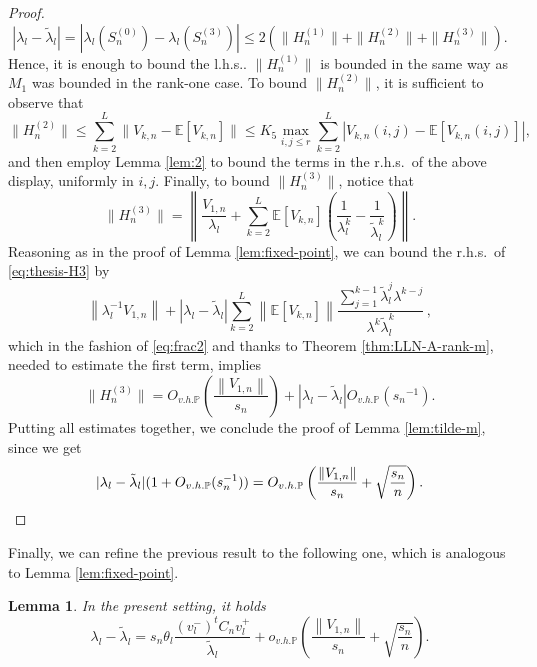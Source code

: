 \documentclass[11pt,oneside]{amsart}
\theoremstyle{plain}
\newtheorem{lemma}[theorem]{Lemma}
\numberwithin{equation}{section}
\newcommand{\rhs}{{r.h.s.~}}
\newcommand{\E}{\mathbb{E}}
\newcommand{\p}{\mathbb{P}}
\newcommand{\centered}{C_n}
\newcommand{\deterministic}{S_n}
\newcommand{\scaling}{s_n}
\newcommand{\ohp}{o_{v.h.\p}}
\newcommand{\Ohp}{O_{v.h.\p}}
\begin{document}
\begin{proof}
\begin{equation}
    |\lambda_l-\tilde \lambda_l|=|\lambda_l(\deterministic^{(0)})-\lambda_l(\deterministic^{(3)})|\le 2(\|H^{(1)}_n\|+\|H^{(2)}_n\|+\|H^{(3)}_n\|).
\end{equation}
Hence, it is enough to bound the l.h.s.. 
$\|H^{(1)}_n\|$ is bounded in the same way as $M_1$ was bounded in the rank-one case.
To bound $\|H^{(2)}_n\|$, it is sufficient to observe that
\begin{equation}
    \|H^{(2)}_n\| \le \sum_{k=2}^{L} \|V_{k,n}-\E[V_{k,n}]\|\le  K_5 \max_{i,j \le r} \sum_{k=2}^{L} |V_{k,n}(i,j)-\E[V_{k,n}(i,j)]|,
\end{equation}
and then employ Lemma \ref{lem:2} to bound the terms in the \rhs of the above display,
uniformly in $i,j$.
Finally, to bound $\|H^{(3)}_n\|$,
notice that
    \begin{equation}  \label{eq:thesis-H3}
        \|H^{(3)}_n\|=\left\| \frac{V_{1,n}}{\lambda_l}+\sum_{k=2}^L\E[V_{k,n}]\left(\frac{1}{\lambda_l^k}-\frac{1}{\tilde \lambda_l^k}\right)\right\|.
    \end{equation}
Reasoning as in the proof of Lemma \ref{lem:fixed-point}, we can bound the \rhs of \eqref{eq:thesis-H3} by
\begin{equation} \label{eq:lambda-tilde-m}
     \left\| \lambda_l^{-1} V_{1,n}\right\|+
     |\lambda_l-\tilde \lambda_l|\sum_{k=2}^L \left\|\E[ V_{k,n}]\right\| \frac{\sum_{j=1}^{k-1}{\tilde\lambda}_l^{j}\lambda^{k-j}}{\lambda^{k}{\tilde\lambda}_l^{k}}\,,
\end{equation}
which in the fashion of \eqref{eq:frac2} and thanks to Theorem \ref{thm:LLN-A-rank-m}, needed to estimate the first term, implies
\begin{equation} 
\|H^{(3)}_n\| = \Ohp\left(\frac{\left\|V_{1,n}\right\|}{\scaling}\right)+|\lambda_l-\tilde{\lambda}_l| \Ohp({\scaling}^{-1}).
\end{equation}
Putting all estimates together, we conclude the proof of Lemma \ref{lem:tilde-m}, since we get
\begin{equation}
    |\lambda_l-\tilde\lambda_l| (1+\Ohp(\scaling^{-1})) = \Ohp\left(\frac{\left\|V_{1,n}\right\|}{\scaling}+\sqrt{\frac{\scaling}{n}}\right). \qedhere
\end{equation}

\end{proof}
Finally, we can refine the previous result to the following one, which is analogous to Lemma \ref{lem:fixed-point}.
\begin{lemma}
   In the present setting, it holds
    \begin{equation}
        \lambda_l - \tilde \lambda_l 
        =\scaling \theta_l \frac{(v_l^-)^t \centered v_l^+}{\tilde \lambda_l} 
        + \ohp \left(\frac{\left\|V_{1,n}\right\|}{\scaling}+\sqrt{\frac{\scaling}{n}}\right).
    \end{equation}
\end{lemma}
\end{document}
